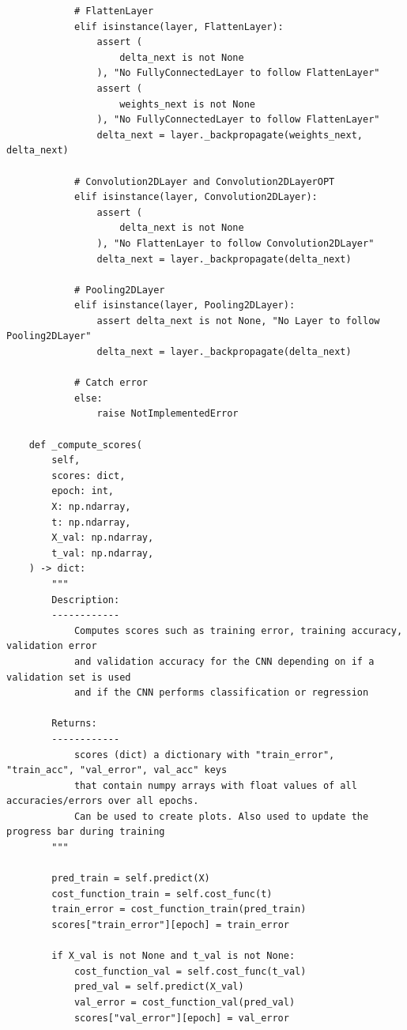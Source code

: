 \documentclass[%
oneside,                 %
final,                   %
10pt]{article}
\begin{document}
\begin{verbatim}
            # FlattenLayer
            elif isinstance(layer, FlattenLayer):
                assert (
                    delta_next is not None
                ), "No FullyConnectedLayer to follow FlattenLayer"
                assert (
                    weights_next is not None
                ), "No FullyConnectedLayer to follow FlattenLayer"
                delta_next = layer._backpropagate(weights_next, delta_next)

            # Convolution2DLayer and Convolution2DLayerOPT
            elif isinstance(layer, Convolution2DLayer):
                assert (
                    delta_next is not None
                ), "No FlattenLayer to follow Convolution2DLayer"
                delta_next = layer._backpropagate(delta_next)

            # Pooling2DLayer
            elif isinstance(layer, Pooling2DLayer):
                assert delta_next is not None, "No Layer to follow Pooling2DLayer"
                delta_next = layer._backpropagate(delta_next)

            # Catch error
            else:
                raise NotImplementedError

    def _compute_scores(
        self,
        scores: dict,
        epoch: int,
        X: np.ndarray,
        t: np.ndarray,
        X_val: np.ndarray,
        t_val: np.ndarray,
    ) -> dict:
        """
        Description:
        ------------
            Computes scores such as training error, training accuracy, validation error
            and validation accuracy for the CNN depending on if a validation set is used
            and if the CNN performs classification or regression

        Returns:
        ------------
            scores (dict) a dictionary with "train_error", "train_acc", "val_error", val_acc" keys
            that contain numpy arrays with float values of all accuracies/errors over all epochs.
            Can be used to create plots. Also used to update the progress bar during training
        """

        pred_train = self.predict(X)
        cost_function_train = self.cost_func(t)
        train_error = cost_function_train(pred_train)
        scores["train_error"][epoch] = train_error

        if X_val is not None and t_val is not None:
            cost_function_val = self.cost_func(t_val)
            pred_val = self.predict(X_val)
            val_error = cost_function_val(pred_val)
            scores["val_error"][epoch] = val_error


\end{verbatim}
\end{document}
